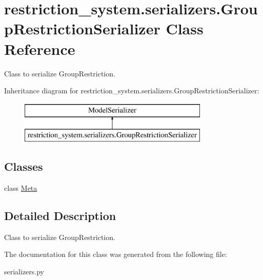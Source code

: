 \hypertarget{classrestriction__system_1_1serializers_1_1GroupRestrictionSerializer}{}\section{restriction\+\_\+system.\+serializers.\+Group\+Restriction\+Serializer Class Reference}
\label{classrestriction__system_1_1serializers_1_1GroupRestrictionSerializer}


Class to serialize Group\+Restriction.  


Inheritance diagram for restriction\+\_\+system.\+serializers.\+Group\+Restriction\+Serializer\+:\begin{figure}[H]
\begin{center}
\leavevmode
\includegraphics[height=2.000000cm]{classrestriction__system_1_1serializers_1_1GroupRestrictionSerializer}
\end{center}
\end{figure}
\subsection*{Classes}
\begin{DoxyCompactItemize}
\item 
class \hyperlink{classrestriction__system_1_1serializers_1_1GroupRestrictionSerializer_1_1Meta}{Meta}
\end{DoxyCompactItemize}


\subsection{Detailed Description}
Class to serialize Group\+Restriction. 

The documentation for this class was generated from the following file\+:\begin{DoxyCompactItemize}
\item 
serializers.\+py\end{DoxyCompactItemize}
